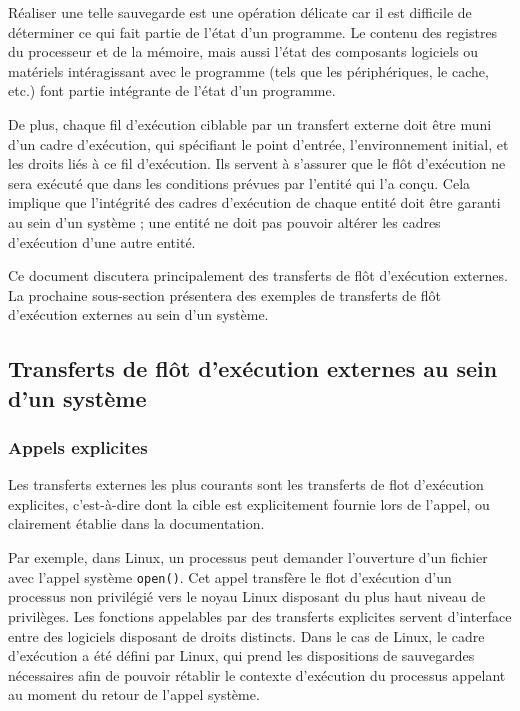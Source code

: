 			Réaliser une telle sauvegarde est une opération délicate car il est difficile de déterminer ce qui fait partie de l'état d'un programme. Le contenu des registres du processeur et de la mémoire, mais aussi l'état des composants logiciels ou matériels intéragissant avec le programme (tels que les périphériques, le cache, etc.) font partie intégrante de l'état d'un programme. 

			De plus, chaque fil d'exécution ciblable par un transfert externe doit être muni d'un cadre d'exécution, qui spécifiant le point d'entrée, l'environnement initial, et les droits liés à ce fil d'exécution. Ils servent à s'assurer que le flôt d'exécution ne sera exécuté que dans les conditions prévues par l'entité qui l'a conçu. Cela implique que l'intégrité des cadres d'exécution de chaque entité doit être garanti au sein d'un système ; une entité ne doit pas pouvoir altérer les cadres d'exécution d'une autre entité.

			Ce document discutera principalement des transferts de flôt d'exécution externes. La prochaine sous-section présentera des exemples de transferts de flôt d'exécution externes au sein d'un système. 

		\subsection{Transferts de flôt d'exécution externes au sein d'un système}

			\subsubsection{Appels explicites}
			Les transferts externes les plus courants sont les transferts de flot d'exécution explicites, c'est-à-dire dont la cible est explicitement fournie lors de l’appel, ou clairement établie dans la documentation.

Par exemple, dans Linux, un processus peut demander l’ouverture d’un fichier avec l’appel système \texttt{open()}. Cet appel transfère le flot d’exécution d’un processus non privilégié vers le noyau Linux disposant du plus haut niveau de privilèges. Les fonctions appelables par des transferts explicites servent d’interface entre des logiciels disposant de droits distincts. Dans le cas de Linux, le cadre d'exécution a été défini par Linux, qui prend les dispositions de sauvegardes nécessaires afin de pouvoir rétablir le contexte d'exécution du processus appelant au moment du retour de l'appel système.

